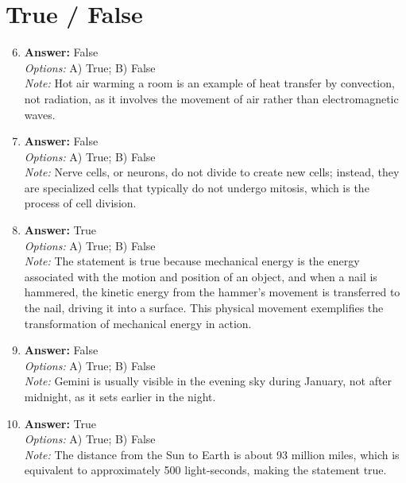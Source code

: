 \documentclass[12pt]{article}
\begin{document}
\section*{True / False}
\begin{enumerate}[label=\arabic*.]
\setcounter{enumi}{5}
\item \textbf{Answer:} False
\\ \textit{Options:} A) True; B) False
\\ \textit{Note:} Hot air warming a room is an example of heat transfer by convection, not radiation, as it involves the movement of air rather than electromagnetic waves.
\item \textbf{Answer:} False
\\ \textit{Options:} A) True; B) False
\\ \textit{Note:} Nerve cells, or neurons, do not divide to create new cells; instead, they are specialized cells that typically do not undergo mitosis, which is the process of cell division.
\item \textbf{Answer:} True
\\ \textit{Options:} A) True; B) False
\\ \textit{Note:} The statement is true because mechanical energy is the energy associated with the motion and position of an object, and when a nail is hammered, the kinetic energy from the hammer's movement is transferred to the nail, driving it into a surface. This physical movement exemplifies the transformation of mechanical energy in action.
\item \textbf{Answer:} False
\\ \textit{Options:} A) True; B) False
\\ \textit{Note:} Gemini is usually visible in the evening sky during January, not after midnight, as it sets earlier in the night.
\item \textbf{Answer:} True
\\ \textit{Options:} A) True; B) False
\\ \textit{Note:} The distance from the Sun to Earth is about 93 million miles, which is equivalent to approximately 500 light-seconds, making the statement true.
\end{enumerate}
\end{document}
